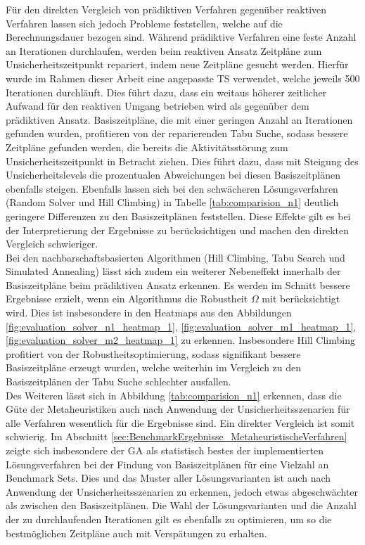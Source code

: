 Für den direkten Vergleich von prädiktiven Verfahren gegenüber reaktiven Verfahren lassen sich jedoch Probleme feststellen, welche auf die Berechnungsdauer bezogen sind. Während prädiktive Verfahren eine feste Anzahl an Iterationen durchlaufen, werden beim reaktiven Ansatz Zeitpläne zum Unsicherheitszeitpunkt repariert, indem neue Zeitpläne gesucht werden. Hierfür wurde im Rahmen dieser Arbeit eine angepasste \acl{TS} verwendet, welche jeweils 500 Iterationen durchläuft. Dies führt dazu, dass ein weitaus höherer zeitlicher Aufwand für den reaktiven Umgang betrieben wird als gegenüber dem prädiktiven Ansatz. Basiszeitpläne, die mit einer geringen Anzahl an Iterationen gefunden wurden, profitieren von der reparierenden Tabu Suche, sodass bessere Zeitpläne gefunden werden, die bereits die Aktivitätsstörung zum Unsicherheitszeitpunkt in Betracht ziehen. Dies führt dazu, dass mit Steigung des Unsicherheitslevels die prozentualen Abweichungen bei diesen Basiszeitplänen ebenfalls steigen. Ebenfalls lassen sich bei den schwächeren Lösungsverfahren (Random Solver und Hill Climbing) in Tabelle \ref{tab:comparision_n1} deutlich geringere Differenzen zu den Basiszeitplänen feststellen. Diese Effekte gilt es bei der Interpretierung der Ergebnisse zu berücksichtigen und machen den direkten Vergleich schwieriger. \\

Bei den nachbarschaftsbasierten Algorithmen (Hill Climbing, Tabu Search und Simulated Annealing) lässt sich zudem ein weiterer Nebeneffekt innerhalb der Basiszeitpläne beim prädiktiven Ansatz erkennen. Es werden im Schnitt bessere Ergebnisse erzielt, wenn ein Algorithmus die Robustheit $\Omega$ mit berücksichtigt wird. Dies ist insbesondere in den Heatmaps aus den Abbildungen \ref{fig:evaluation_solver_n1_heatmap_1}, \ref{fig:evaluation_solver_m1_heatmap_1}, \ref{fig:evaluation_solver_m2_heatmap_1} zu erkennen. Insbesondere Hill Climbing profitiert von der Robustheitsoptimierung, sodass signifikant bessere Basiszeitpläne erzeugt wurden, welche weiterhin im Vergleich zu den Basiszeitplänen der Tabu Suche schlechter ausfallen. \\ 

Des Weiteren lässt sich in Abbildung \ref{tab:comparision_n1} erkennen, dass die Güte der Metaheuristiken auch nach Anwendung der Unsicherheitsszenarien für alle Verfahren wesentlich für die Ergebnisse sind. Ein direkter Vergleich ist somit schwierig. Im Abschnitt \ref{sec:BenchmarkErgebnisse_MetaheuristischeVerfahren} zeigte sich insbesondere der \ac{GA} als statistisch bestes der implementierten Lösungsverfahren bei der Findung von Basiszeitplänen für eine Vielzahl an Benchmark Sets. Dies und das Muster aller Lösungsvarianten ist auch nach Anwendung der Unsicherheitsszenarien zu erkennen, jedoch etwas abgeschwächter als zwischen den Basiszeitplänen. Die Wahl der Lösungsvarianten und die Anzahl der zu durchlaufenden Iterationen gilt es ebenfalls zu optimieren, um so die bestmöglichen Zeitpläne auch mit Verspätungen zu erhalten. \\


